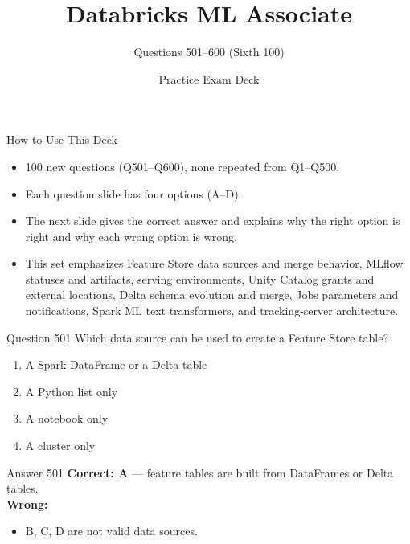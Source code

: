 \documentclass[aspectratio=169,11pt]{beamer}
\title{Databricks ML Associate}
\subtitle{Questions 501--600 (Sixth 100)}
\author{Practice Exam Deck}
\date{}
\begin{document}
	
	\begin{frame}
		\titlepage
	\end{frame}
	
	\begin{frame}{How to Use This Deck}
		\begin{itemize}
			\item 100 new questions (Q501--Q600), none repeated from Q1--Q500.
			\item Each question slide has four options (A--D).
			\item The next slide gives the correct answer and explains why the right option is right and why each wrong option is wrong.
			\item This set emphasizes Feature Store data sources and merge behavior, MLflow statuses and artifacts, serving environments, Unity Catalog grants and external locations, Delta schema evolution and merge, Jobs parameters and notifications, Spark ML text transformers, and tracking-server architecture.
		\end{itemize}
	\end{frame}
	
	\begin{frame}{Question 501}
		Which data source can be used to create a Feature Store table?
		\begin{enumerate}[label=\Alph*.]
			\item A Spark DataFrame or a Delta table
			\item A Python list only
			\item A notebook only
			\item A cluster only
		\end{enumerate}
	\end{frame}
	\begin{frame}{Answer 501}
		\textbf{Correct: A} --- feature tables are built from DataFrames or Delta tables.\\
		\vspace{0.5em}
		\textbf{Wrong:}
		\begin{itemize}
			\item B, C, D are not valid data sources.
		\end{itemize}
	\end{frame}
	
\end{document}
